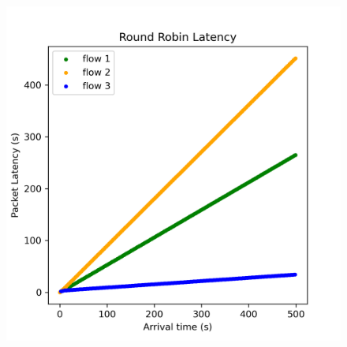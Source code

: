 \documentclass[compress]{beamer}
\begin{document}
\begin{frame}
\begin{columns}
\begin{column}{0.5\textwidth}
\begin{figure}
                    \includegraphics[width=\textwidth]{img/rr_latency}
                \end{figure}
            \end{column}
        \end{columns}
    \end{frame}
\end{document}
